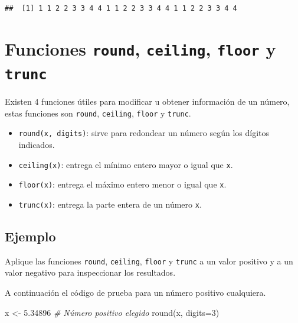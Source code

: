 \documentclass[
]{book}
\makeatletter
\newenvironment{Shaded}{\begin{snugshade}}{\end{snugshade}}
\newcommand{\AttributeTok}[1]{\textcolor[rgb]{0.77,0.63,0.00}{#1}}
\newcommand{\CommentTok}[1]{\textcolor[rgb]{0.56,0.35,0.01}{\textit{#1}}}
\newcommand{\DecValTok}[1]{\textcolor[rgb]{0.00,0.00,0.81}{#1}}
\newcommand{\FloatTok}[1]{\textcolor[rgb]{0.00,0.00,0.81}{#1}}
\newcommand{\FunctionTok}[1]{\textcolor[rgb]{0.00,0.00,0.00}{#1}}
\newcommand{\NormalTok}[1]{#1}
\newcommand{\OtherTok}[1]{\textcolor[rgb]{0.56,0.35,0.01}{#1}}
\providecommand{\tightlist}{%
  \setlength{\itemsep}{0pt}\setlength{\parskip}{0pt}}
\newenvironment{kframe}{%
\medskip{}
\setlength{\fboxsep}{.8em}
 \def\at@end@of@kframe{}%
 \ifinner\ifhmode%
  \def\at@end@of@kframe{\end{minipage}}%
  \begin{minipage}{\columnwidth}%
 \fi\fi%
 \def\FrameCommand##1{\hskip\@totalleftmargin \hskip-\fboxsep
 \colorbox{shadecolor}{##1}\hskip-\fboxsep
     \hskip-\linewidth \hskip-\@totalleftmargin \hskip\columnwidth}%
 \MakeFramed {\advance\hsize-\width
   \@totalleftmargin\z@ \linewidth\hsize
   \@setminipage}}%
 {\par\unskip\endMakeFramed%
 \at@end@of@kframe}
\renewenvironment{Shaded}{\begin{kframe}}{\end{kframe}}
\makeatother
\begin{document}
\begin{verbatim}
##  [1] 1 1 2 2 3 3 4 4 1 1 2 2 3 3 4 4 1 1 2 2 3 3 4 4
\end{verbatim}

\hypertarget{funciones-round-ceiling-floor-y-trunc}{%
\section{\texorpdfstring{Funciones \texttt{round}, \texttt{ceiling}, \texttt{floor} y \texttt{trunc}}{Funciones round, ceiling, floor y trunc}}\label{funciones-round-ceiling-floor-y-trunc}}

Existen 4 funciones útiles para modificar u obtener información de un número, estas funciones son \texttt{round}, \texttt{ceiling}, \texttt{floor} y \texttt{trunc}.

\begin{itemize}
\tightlist
\item
  \texttt{round(x,\ digits)}: sirve para redondear un número según los dígitos indicados.
\item
  \texttt{ceiling(x)}: entrega el mínimo entero mayor o igual que \texttt{x}.
\item
  \texttt{floor(x)}: entrega el máximo entero menor o igual que \texttt{x}.
\item
  \texttt{trunc(x)}: entrega la parte entera de un número \texttt{x}.
\end{itemize}

\hypertarget{ejemplo-13}{%
\subsection*{Ejemplo}\label{ejemplo-13}}

Aplique las funciones \texttt{round}, \texttt{ceiling}, \texttt{floor} y \texttt{trunc} a un valor positivo y a un valor negativo para inspeccionar los resultados.

A continuación el código de prueba para un número positivo cualquiera.

\begin{Shaded}
\begin{Highlighting}[]
\NormalTok{x }\OtherTok{\textless{}{-}} \FloatTok{5.34896}  \CommentTok{\# Número positivo elegido}
\FunctionTok{round}\NormalTok{(x, }\AttributeTok{digits=}\DecValTok{3}\NormalTok{)}
\end{Highlighting}
\end{Shaded}
\end{document}
